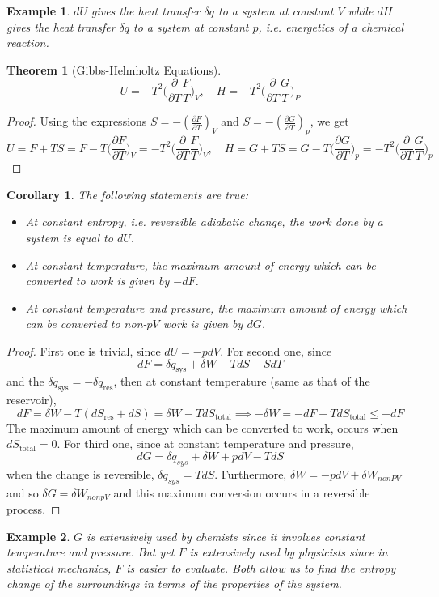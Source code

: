 \documentclass[a4paper]{article}
\newtheorem{eg}{Example}[section]
\theoremstyle{new}
\newtheorem{thm}{Theorem}[section]
\newtheorem{cor}{Corollary}[section]
\begin{document}
\begin{eg}
$dU$ gives the heat transfer $\delta q$ to a system at constant $V$ while $dH$ gives the heat transfer $\delta q$ to a system at constant $p$, i.e. energetics of a chemical reaction.
\end{eg}
\begin{thm}[Gibbs-Helmholtz Equations]
$$U=-T^2\bigg(\frac{\partial}{\partial T}\frac{F}{T}\bigg)_V,\quad H=-T^2\bigg(\frac{\partial}{\partial T}\frac{G}{T}\bigg)_P$$
\end{thm}
\begin{proof}
Using the expressions $S=-(\frac{\partial F}{\partial T})_V$ and $S=-(\frac{\partial G}{\partial T})_p$, we get
$$U=F+TS=F-T\bigg(\frac{\partial F}{\partial T}\bigg)_V=-T^2\bigg(\frac{\partial}{\partial T}\frac{F}{T}\bigg)_V,\quad H=G+TS=G-T\bigg(\frac{\partial G}{\partial T}\bigg)_p=-T^2\bigg(\frac{\partial}{\partial T}\frac{G}{T}\bigg)_p$$
\end{proof}
\begin{cor}
The following statements are true:
\begin{itemize}
    \item At constant entropy, i.e. reversible adiabatic change, the work done by a system is equal to $dU$.
    \item At constant temperature, the maximum amount of energy which can be converted to work is given by $-dF$.
    \item At constant temperature and pressure, the maximum amount of energy which can be converted to non-$pV$ work is given by $dG$.
\end{itemize}
\end{cor}
\begin{proof}
First one is trivial, since $dU=-pdV$. For second one, since
$$dF=\delta q_{\text{sys}}+\delta W-TdS-SdT$$
and the $\delta q_{\text{sys}}=-\delta q_{\text{res}}$, then at constant temperature (same as that of the reservoir),
$$dF=\delta W-T(dS_{\text{res}}+dS)=\delta W-TdS_{\text{total}}\implies -\delta W=-dF-TdS_{\text{total}}\leq -dF$$
The maximum amount of energy which can be converted to work, occurs when $dS_{\text{total}}=0$. For third one, since at constant temperature and pressure,
$$dG=\delta q_{sys}+\delta W+pdV−TdS$$
when the change is reversible, $\delta q_{sys}=TdS$. Furthermore, $\delta W=-pdV+\delta W_{nonPV}$ and so $\delta G=\delta W_{nonpV}$ and this maximum conversion occurs in a reversible process.
\end{proof}
\begin{eg}
$G$ is extensively used by chemists since it involves constant temperature and pressure. But yet $F$ is extensively used by physicists since in statistical mechanics, $F$ is easier to evaluate. Both allow us to find the entropy change of the surroundings in terms of the properties of the system.
\end{eg}
\newpage
\end{document}
